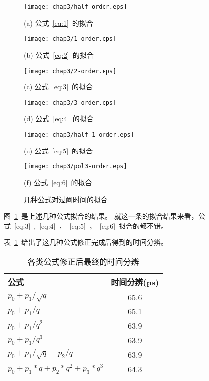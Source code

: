 \begin{figure}[!h]
\begin{minipage}{0.5\linewidth}
  \centerline{\texttt{[image: chap3/half-order.eps]}}
  \centerline{(a) 公式~\ref{eq:1}~的拟合}
  \centerline{\label{fig:half-order}}
\end{minipage}
\hfill
\begin{minipage}{0.5\linewidth}
  \centerline{\texttt{[image: chap3/1-order.eps]}}
  \centerline{(b) 公式~\ref{eq:2}~的拟合}
  \centerline{\label{fig:1-order}}
\end{minipage}
\vfill
\begin{minipage}{0.5\linewidth}
  \centerline{\texttt{[image: chap3/2-order.eps]}}
  \centerline{(c) 公式~\ref{eq:3}~的拟合}
  \centerline{\label{fig:2-order}}
\end{minipage}
\hfill
\begin{minipage}{0.5\linewidth}
  \centerline{\texttt{[image: chap3/3-order.eps]}}
  \centerline{(d) 公式~\ref{eq:4}~的拟合}
  \centerline{\label{fig:3-order}}
\end{minipage}
\vfill
\begin{minipage}{0.5\linewidth}
  \centerline{\texttt{[image: chap3/half-1-order.eps]}}
  \centerline{(e) 公式~\ref{eq:5}~的拟合}
  \centerline{\label{fig:half-1-order}}
\end{minipage}
\hfill
\begin{minipage}{0.5\linewidth}
  \centerline{\texttt{[image: chap3/pol3-order.eps]}}
  \centerline{(f) 公式~\ref{eq:6}~的拟合}
  \centerline{\label{fig:pol3-order}}
\end{minipage}
\caption{几种公式对过阈时间的拟合}
\label{fig:single-formula}
\end{figure}
图~\ref{fig:single-formula}~是上述几种公式拟合的结果。
就这一条的拟合结果来看，公式~\ref{eq:3}~,~\ref{eq:4}~，~\ref{eq:5}~，~\ref{eq:6}~拟合的都不错。

表~\ref{tbl:resolution}~给出了这几种公式修正完成后得到的时间分辨。

\begin{table}[h]
    \centering
    \caption{\label{tbl:resolution} 各类公式修正后最终的时间分辨}
  \footnotesize
    \begin{tabular}{lc}
        \hline
        公式& 时间分辨(ps) \\
        \hline
        ${p_{0}+p_{1}/\sqrt{q}}$ & 65.6 \\
        ${p_{0}+p_{1}/q}$ & 65.1 \\
        ${p_{0}+p_{1}/q^{2}}$ & 63.9 \\
        ${p_{0}+p_{1}/q^{3}}$ & 63.9 \\
        ${p_{0}+p_{1}/\sqrt{q}+p_{2}/q}$ & 63.9 \\
        ${p_{0}+p_{1}*q+p_{2}*q^{2}+p_{3}*q^3}$ & 64.3 \\
        \hline
    \end{tabular}
\end{table}

